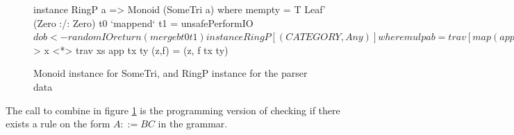 \documentclass[a4paper,12pt,notitlepage]{report}
\begin{document}
\begin{figure}[H]
\begin{code}
instance RingP a => Monoid (SomeTri a) where
    mempty = T Leaf' (Zero :/: Zero)
    t0 `mappend` t1 = unsafePerformIO $ do
      b <- randomIO
      return (merge b t0 t1)

instance RingP [(CATEGORY,Any)] where
  mul p a b = trav [map (app tx ty) l :/: map (app tx ty) r 
                   | (x,tx) <- a, (y,ty) <- b
                   , let l:/:r = combine p x y]
    where trav :: [Pair [a]] -> Pair [a]
          trav [] = pure []
          trav (x:xs) = (++) <$> x <*> trav xs
          app tx ty (z,f)  = (z, f tx ty)
\end{code}
\caption{\label{parsemonoid}Monoid instance for SomeTri, and RingP instance for
the parser data}
\end{figure}
The call to combine in figure \ref{parsemonoid} is the programming version of
checking if there exists a rule on the form $A ::= BC$ in the grammar.
\end{document}
